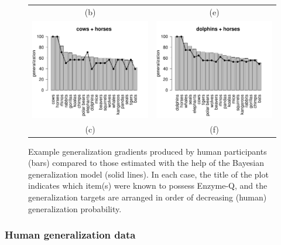 \documentclass[doc,floatsintext]{apa6}
\begin{document}
\begin{figure}[p]
\begin{center}
\begin{tabular}{cc}
	(b) & (e) \\
	\includegraphics[width=6.5cm]{generalization_figs/cowshorses.pdf} &
	\includegraphics[width=6.5cm]{generalization_figs/dolphinshorses.pdf} \\
	(c) & (f) \\
\end{tabular}
\vspace*{12pt}
\caption{Example generalization gradients produced by human participants (bars) compared to those estimated with the help of the Bayesian generalization model (solid lines). In each case, the title of the plot indicates which item(s) were known to possess Enzyme-Q, and the generalization targets are arranged in order of decreasing (human) generalization probability.}
\label{fig:gen_posterior_pred}
\end{center}
\end{figure}

\bigskip
\subsubsection*{Human generalization data}
\end{document}
